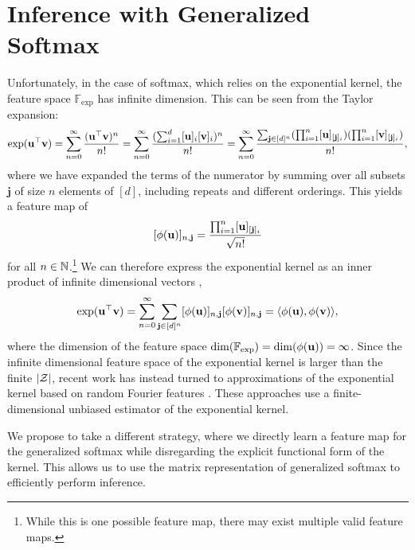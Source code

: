 \documentclass{article}
\begin{document}
\section{Inference with Generalized Softmax}
Unfortunately, in the case of softmax, which relies on the exponential kernel,
the feature space $\mathbb{F}_{\exp}$ has infinite dimension.
This can be seen from the Taylor expansion:
$$
\exp(\mathbf{u}^\top \mathbf{v})
= \sum_{n=0}^\infty \frac{(\mathbf{u}^\top \mathbf{v})^n}{n!}
= \sum_{n=0}^\infty \frac{(\sum_{i=1}^d[\mathbf{u}]_i[\mathbf{v}]_i)^n}{n!}
= \sum_{n=0}^\infty \frac{\sum_{\mathbf{j} \in [d]^n}
    (\prod_{i=1}^n [\mathbf{u}]_{[\mathbf{j}]_i})
    (\prod_{i=1}^n [\mathbf{v}]_{[\mathbf{j}]_i})}{n!},
$$
where we have expanded the terms of the numerator by summing over all subsets
$\mathbf{j}$ of size $n$ elements of $[d]$, including repeats and different
orderings.
This yields a feature map of 
$$[\phi(\mathbf{u})]_{n,\mathbf{j}} = \frac{\prod_{i=1}^n [\mathbf{u}]_{[\mathbf{j}]_i}}{\sqrt{n!}}$$
for all $n\in\mathbb{N}$.\footnote{
While this is one possible feature map, there may exist
multiple valid feature maps.
}
We can therefore express the exponential kernel as an inner product of
infinite dimensional vectors \citep{cotter2011gausskernel},
$$\exp(\mathbf{u}^\top\mathbf{v}) 
= \sum_{n=0}^\infty\sum_{\mathbf{j}\in[d]^n}[\phi(\mathbf{u})]_{n,\mathbf{j}}[\phi(\mathbf{v})]_{n,\mathbf{j}}
= \langle \phi(\mathbf{u}), \phi(\mathbf{v}) \rangle,
$$
where the dimension of the feature space $\dim(\mathbb{F}_{\exp}) = \dim(\phi(\mathbf{u})) = \infty$.
Since the infinite dimensional feature space of the exponential kernel is larger than
the finite $|\mathcal{Z}|$, recent work has instead turned to approximations of the exponential kernel
based on random Fourier features
\citep{rawat2019sampledsoftmax,choromanski2020performer,peng2021rfa}.
These approaches use a finite-dimensional unbiased estimator of the exponential kernel.

We propose to take a different strategy, where we directly learn a feature map
for the generalized softmax while disregarding the explicit functional form of the kernel.
This allows us to use the matrix representation of generalized softmax to 
efficiently perform inference.
\end{document}
